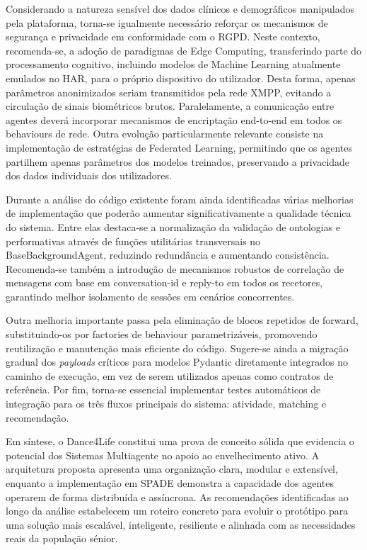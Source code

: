 \documentclass[runningheads]{llncs}
\begin{document}
Considerando a natureza sensível dos dados clínicos e demográficos manipulados pela plataforma, torna-se igualmente necessário reforçar os mecanismos de segurança e privacidade em conformidade com o RGPD. Neste contexto, recomenda-se, a adoção de paradigmas de Edge Computing, transferindo parte do processamento cognitivo, incluindo modelos de Machine Learning atualmente emulados no HAR, para o próprio dispositivo do utilizador. Desta forma, apenas parâmetros anonimizados seriam transmitidos pela rede XMPP, evitando a circulação de sinais biométricos brutos. Paralelamente, a comunicação entre agentes deverá incorporar mecanismos de encriptação end-to-end em todos os behaviours de rede. Outra evolução particularmente relevante consiste na implementação de estratégias de Federated Learning, permitindo que os agentes partilhem apenas parâmetros dos modelos treinados, preservando a privacidade dos dados individuais dos utilizadores. 

Durante a análise do código existente foram ainda identificadas várias melhorias de implementação que poderão aumentar significativamente a qualidade técnica do sistema. Entre elas destaca-se a normalização da validação de ontologias e performativas através de funções utilitárias transversais no BaseBackgroundAgent, reduzindo redundância e aumentando consistência. Recomenda-se também a introdução de mecanismos robustos de correlação de mensagens com base em conversation-id e reply-to em todos os recetores, garantindo melhor isolamento de sessões em cenários concorrentes.  

Outra melhoria importante passa pela eliminação de blocos repetidos de forward, substituindo-os por factories de behaviour parametrizáveis, promovendo reutilização e manutenção mais eficiente do código. Sugere-se ainda a migração gradual dos \textit{payloads} críticos para modelos Pydantic diretamente integrados no caminho de execução, em vez de serem utilizados apenas como contratos de referência. Por fim, torna-se essencial implementar testes automáticos de integração para os três fluxos principais do sistema: atividade, matching e recomendação. 

Em síntese, o Dance4Life constitui uma prova de conceito sólida que evidencia o potencial dos Sistemas Multiagente no apoio ao envelhecimento ativo. A arquitetura proposta apresenta uma organização clara, modular e extensível, enquanto a implementação em SPADE demonstra a capacidade dos agentes operarem de forma distribuída e assíncrona. As recomendações identificadas ao longo da análise estabelecem um roteiro concreto para evoluir o protótipo para uma solução mais escalável, inteligente, resiliente e alinhada com as necessidades reais da população sénior. 
\end{document}

